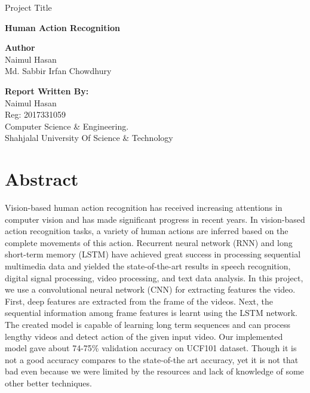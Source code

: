 \documentclass[a4paper,12pt]{article}
\begin{document}
\begin{titlepage}
    \begin{center}
        \vspace*{1cm}
            
        \LARGE
        Project Title
            
        \vspace{0.5cm}
        \Huge
        \textbf{Human Action Recognition}
            
        \vspace{0.5cm}
            
        \textbf{Author \\}
            Naimul Hasan \\
            Md. Sabbir Irfan Chowdhury
            
        \vspace{6cm}
        \large
        \textbf{Report Written By:}\\
        Naimul Hasan \\
        Reg: 2017331059 \\
        Computer Science \& Engineering. \\
        Shahjalal University Of Science \& Technology \\
        \date{\today}
            
    \end{center}
\end{titlepage}
\thispagestyle{empty}
\section*{Abstract} 
Vision-based human action recognition has received increasing attentions in computer vision and has made significant progress in recent years. In vision-based action recognition tasks, a variety of human actions are inferred based on the complete movements of this action. Recurrent neural network (RNN) and long short-term memory (LSTM) have achieved great success in processing sequential multimedia data and yielded the state-of-the-art results in speech recognition, digital signal processing, video processing, and text data analysis. In this project, we use a convolutional neural network (CNN) for extracting features the video. First, deep features are extracted from the frame of the videos. Next, the sequential information among frame features is learnt using the LSTM network. The created model is capable of learning long term sequences and can process lengthy videos and detect action of the given input video. Our implemented model gave about 74-75\% validation accuracy on UCF101 dataset. Though it is not a good accuracy compares to the state-of-the art accuracy, yet it is not that bad even because we were limited by the resources and lack of knowledge of some other better techniques.
\newpage
{}
\tableofcontents
\newpage
{}
\end{document}
